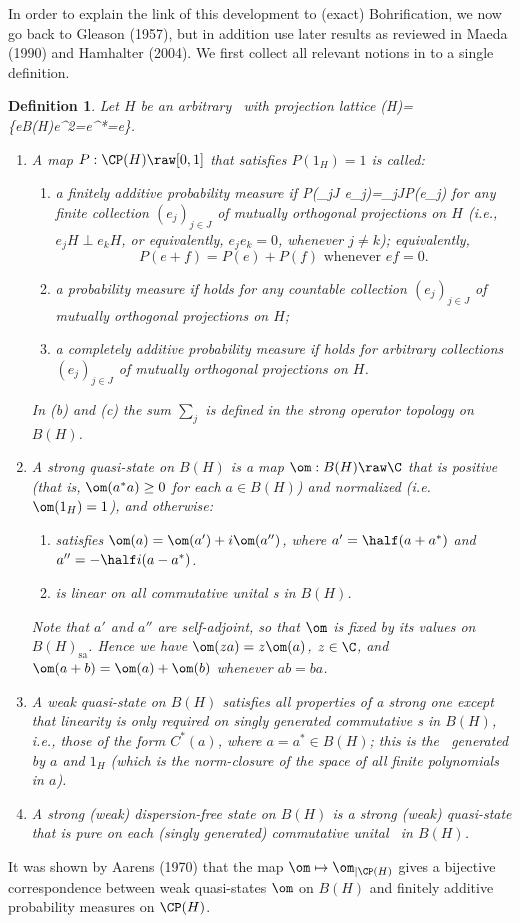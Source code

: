\documentclass[12pt]{article}
\newtheorem{Definition}{Definition}[section]
\begin{document}
 In order to explain the link of this development to (exact) Bohrification, we now go back to Gleason (1957), but in addition use later results as reviewed in Maeda (1990) and Hamhalter (2004). We first collect all relevant notions in to a single definition. 
 \begin{Definition}\label{gleasondefs2}
Let $H$ be an arbitrary \Hs\ with projection lattice 
\beq\CP(H)=\{e\in B(H)\mid e^2=e^*=e\}.
\eeq
\begin{enumerate}
\item A map $P:\CP(H)\raw[0,1]$ that satisfies  $P(1_H)=1$ is called:
\begin{enumerate}
\item  a \emph{finitely additive probability measure} if 
\beq
P\left(\sum_{j\in J} e_j\right)=\sum_{j\in J}P(e_j) \label{whatsum}
\eeq for any \emph{finite} 
collection $(e_j)_{j\in J}$ of mutually orthogonal projections on $H$
(i.e., $e_jH\perp e_k H$, or equivalently, $e_je_k=0$, whenever $j\neq k$);   equivalently,
$$ P(e+f)=P(e)+P(f) \mbox{ whenever } ef=0.$$
\item a \emph{probability measure} if  holds for any \emph{countable} collection $(e_j)_{j\in J}$ of mutually orthogonal projections on $H$;
\item  a \emph{completely additive probability measure} if   holds for  \emph{arbitrary} 
collections $(e_j)_{j\in J}$ of mutually orthogonal projections on $H$.
\end{enumerate}
In (b) and (c) the sum $\sum_j$ is defined in the \emph{strong} operator topology on $B(H)$.
\item A \emph{strong quasi-state} on $B(H)$ is a map $\om:B(H)\raw\C$ that is positive (that is, $\om(a^*a)\geq 0$ for each $a\in B(H)$) 
and normalized (i.e.\ $\om(1_H)=1$), and otherwise:
\begin{enumerate}
\item satisfies $\om(a)=\om(a')+i\om(a'')$, where $a'= \half (a+a^*)$ and $a''=-\half i(a-a^*)$.
\item is linear on all commutative unital \ca s in $B(H)$. 
\end{enumerate}
Note that $a'$ and $a''$ are self-adjoint, so that $\om$ is fixed by its values on $B(H)_{\mathrm{sa}}$. 
Hence we have $\om(z a)=z\om(a)$, $z\in\C$, and $\om(a+b)=\om(a)+\om(b)$ whenever $ab=ba$.
\item  A \emph{weak quasi-state} on $B(H)$ satisfies all properties of a strong one except that linearity is only required on   \emph{singly generated} commutative \ca s in $B(H)$, i.e., those of the form $C^*(a)$, where $a=a^*\in B(H)$; this  is the  \ca\ generated by $a$ and $1_H$ (which is the norm-closure of the space of all finite polynomials in $a$).
\item A \emph{strong (weak) dispersion-free state}  on $B(H)$ is a strong (weak) quasi-state  that is pure on each (singly generated) commutative unital \ca\ in $B(H)$.
\end{enumerate}
\end{Definition}
It was shown by Aarens (1970) that the map $\om\mapsto \om_{|\CP(H)}$ gives a bijective correspondence between weak quasi-states $\om$ on $B(H)$ and
finitely additive probability measures on $\CP(H)$.
\end{document}
